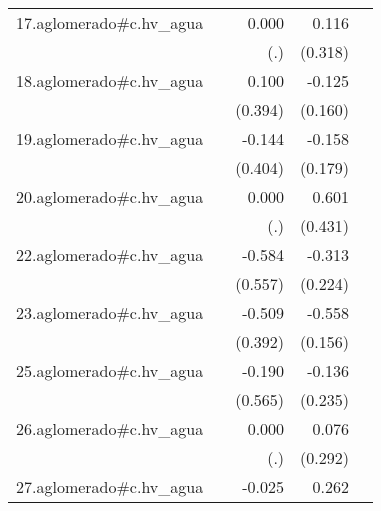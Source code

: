 {\begin{longtable}{l*{4}{D{.}{.}{-1}}}
\addlinespace
17.aglomerado#c.hv\_agua&                     &       0.000         &       0.116         &                     \\
            &                     &         (.)         &     (0.318)         &                     \\
\addlinespace
18.aglomerado#c.hv\_agua&                     &       0.100         &      -0.125         &                     \\
            &                     &     (0.394)         &     (0.160)         &                     \\
\addlinespace
19.aglomerado#c.hv\_agua&                     &      -0.144         &      -0.158         &                     \\
            &                     &     (0.404)         &     (0.179)         &                     \\
\addlinespace
20.aglomerado#c.hv\_agua&                     &       0.000         &       0.601         &                     \\
            &                     &         (.)         &     (0.431)         &                     \\
\addlinespace
22.aglomerado#c.hv\_agua&                     &      -0.584         &      -0.313         &                     \\
            &                     &     (0.557)         &     (0.224)         &                     \\
\addlinespace
23.aglomerado#c.hv\_agua&                     &      -0.509         &      -0.558\sym{***}&                     \\
            &                     &     (0.392)         &     (0.156)         &                     \\
\addlinespace
25.aglomerado#c.hv\_agua&                     &      -0.190         &      -0.136         &                     \\
            &                     &     (0.565)         &     (0.235)         &                     \\
\addlinespace
26.aglomerado#c.hv\_agua&                     &       0.000         &       0.076         &                     \\
            &                     &         (.)         &     (0.292)         &                     \\
\addlinespace
27.aglomerado#c.hv\_agua&                     &      -0.025         &       0.262         &                     \\

\end{longtable}}
